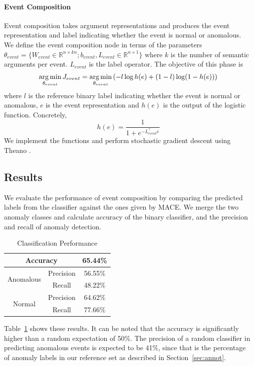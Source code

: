 \paragraph{Event Composition}
Event composition takes argument representations and produces the event
representation and label indicating whether the event is
normal or anomalous.  We define the event composition node in terms of the
parameters $\theta_{event} = \{W_{event} \in \mathbb{R}^{n \times kn}; b_{event},
L_{event} \in \mathbb{R}^{n \times 1}\}$
where $k$ is the number of semantic arguments per event.  $L_{event}$ is the
label operator.  The objective of this
phase is 
\begin{align*}
\begin{aligned}
\operatorname*{arg\,min}_{\theta_{event}} J_{event} = \operatorname*{arg\,min}_{\theta_{event}} \left( - l \log h(e) + (1-l) \log (1 - h(e)) \right)
\end{aligned}
\end{align*}
where $l$ is the reference binary label indicating whether the event is normal or
anomalous, $e$ is the event representation and
$h(e)$ is the output of the logistic function.  Concretely,
\begin{equation*}
 h(e) = \frac{1}{1+e^{-L_{event}^\intercal e}}
\end{equation*}
We implement the functions and perform stochastic gradient descent using Theano
\cite{bergstra2010theano}.

\subsection{Results}
We evaluate the performance of event composition by comparing the predicted
labels from the classifier against the ones given by MACE.
We merge the two anomaly classes and calculate accuracy of the binary
classifier, and the precision and recall of anomaly detection.
\begin{table}
\begin{center}
  \begin{tabular}[c]{|c|c|c|}
 \hline
 \multicolumn{2}{|c|}{Accuracy} & 65.44\% \\
 \hline
 \multirow{2}{*}{Anomalous} & Precision & 56.55\% \\
 \cline{2-3}
 & Recall & 48.22\% \\
 \hline
 \multirow{2}{*}{Normal} & Precision & 64.62\% \\
 \cline{2-3}
 & Recall & 77.66\% \\
 \hline
  \end{tabular}
\end{center}
 \caption{Classification Performance}
 \label{table:res1}
\end{table}
Table~\ref{table:res1} shows these results.  It can be noted that the accuracy
is significantly higher than a random 
expectation of 50\%.  The precision of a random classifier in predicting
anomalous events is expected to be 41\%, since 
that is the percentage of anomaly labels in our reference set as described in
Section~\ref{sec:annot}.
